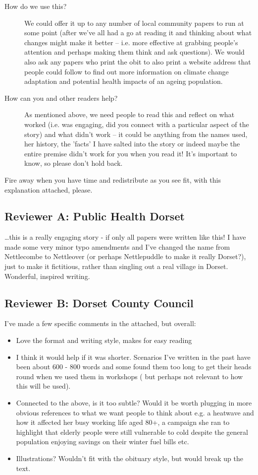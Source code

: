 \begin{description}
\item [How do we use this?] We could offer it up to any number of local community papers to run at some point (after we've all had a go at reading it and thinking about what changes might make it better -- i.e. more effective at grabbing people's attention and perhaps making them think and ask questions). We would also ask any papers who print the obit to also print a website address that people could follow to find out more information on climate change adaptation and potential health impacts of an ageing population.
\item [How can you and other readers help?] As mentioned above, we need people to read this and reflect on what worked (i.e. was engaging, did you connect with a particular aspect of the story) and what didn't work -- it could be anything from the names used, her history, the 'facts' I have salted into the story or indeed maybe the entire premise didn't work for you when you read it! It's important to know, so please don't hold back. 
\end{description}

Fire away when you have time and redistribute as you see fit, with this explanation attached, please.

\subsection{Reviewer A: Public Health Dorset}
\dots this is a really engaging story - if only all papers were written like this!  I have made some very minor typo amendments and I've changed the name from Nettlecombe to Nettleover (or perhaps Nettlepuddle to make it really Dorset?), just to make it fictitious, rather than singling out a real village in Dorset.  Wonderful, inspired writing.

\subsection{Reviewer B: Dorset County Council}
I've made a few specific comments in the attached, but overall:

\begin{itemize}
\item Love the format and writing style,  makes for easy reading
\item I think it would help if it was shorter. Scenarios I've written in the past have been about 600 - 800 words and some found them too long to get their heads round when we used them in workshops ( but perhaps not relevant to how this will be used).
\item Connected to the above, is it too subtle? Would it be worth plugging in more obvious references to what we want people to think about e.g. a heatwave and how it affected her busy working life aged 80+, a campaign she ran to highlight that elderly people were still vulnerable to cold despite the general population enjoying savings on their winter fuel bills etc.  
\item Illustrations? Wouldn't fit with the obituary style, but would break up the text.
\end{itemize}

